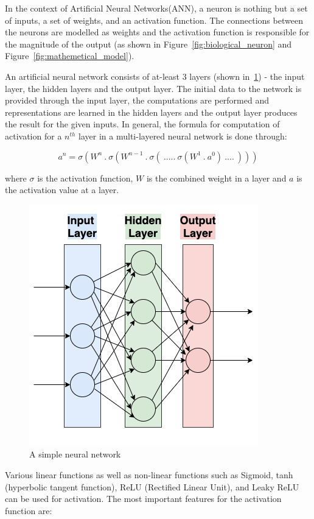 In the context of Artificial Neural Networks(ANN), a neuron is nothing but a set of inputs, a set of weights, and an activation function. The connections between the neurons are modelled as weights and the activation function is responsible for the magnitude of the output (as shown in Figure~\ref{fig:biological_neuron} and Figure~\ref{fig:mathemetical_model}). 

An artificial neural network consists of at-least 3 layers (shown in~\ref{fig:neural_network}) - the input layer, the hidden layers and the output layer. The initial data to the network is provided through the input layer, the computations are performed and representations are learned in the hidden layers and the output layer produces the result for the given inputs. In general, the formula for computation of activation for a $n^{th}$ layer in a multi-layered neural network is done through:

\[a^n = \sigma(W^n\:.\:\sigma(W^{n-1}\:.\:\sigma(\:.....\:\sigma(W^1\:.\:a^0)\:....\:)))\]

where $\sigma$ is the activation function, $W$ is the combined weight in a layer and $a$ is the activation value at a layer.
\begin{figure}[t]
    \centering
    \includegraphics[width=0.7\linewidth]{BachelorMasterThesis/TheoreticalBackground/Figures/A_Simple_NN.png}
    \caption{A simple neural network}
    \label{fig:neural_network}
\end{figure}

Various linear functions as well as non-linear functions such as Sigmoid, tanh (hyperbolic tangent function), ReLU (Rectified Linear Unit), and Leaky ReLU can be used for activation. The most important features for the activation function are:

